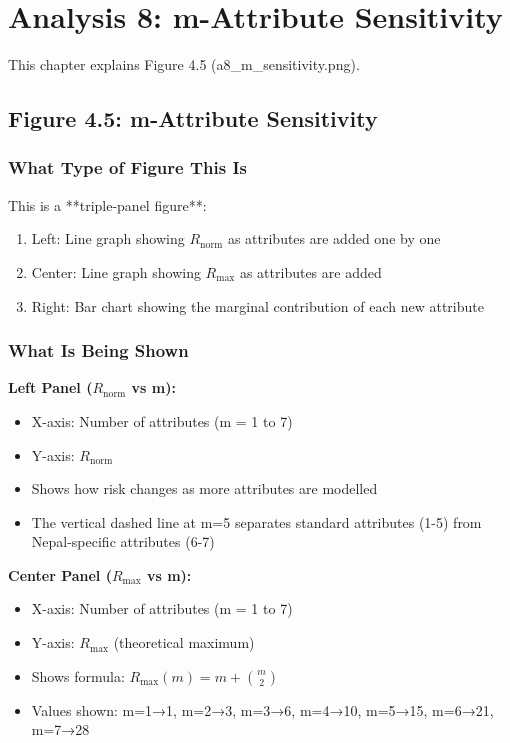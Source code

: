 \documentclass[12pt,a4paper,oneside,openany]{report}
\begin{document}
\chapter{Analysis 8: m-Attribute Sensitivity}
\label{chap:a8}

This chapter explains Figure 4.5 (a8\_m\_sensitivity.png).

\section{Figure 4.5: m-Attribute Sensitivity}
\label{sec:f4.5}

\subsection{What Type of Figure This Is}
This is a **triple-panel figure**:
\begin{enumerate}
    \item Left: Line graph showing $R_{\mathrm{norm}}$ as attributes are added one by one
    \item Center: Line graph showing $R_{\mathrm{max}}$ as attributes are added
    \item Right: Bar chart showing the marginal contribution of each new attribute
\end{enumerate}

\subsection{What Is Being Shown}

\textbf{Left Panel ($R_{\mathrm{norm}}$ vs m):}
\begin{itemize}
    \item X-axis: Number of attributes (m = 1 to 7)
    \item Y-axis: $R_{\mathrm{norm}}$
    \item Shows how risk changes as more attributes are modelled
    \item The vertical dashed line at m=5 separates standard attributes (1-5) from Nepal-specific attributes (6-7)
\end{itemize}

\textbf{Center Panel ($R_{\mathrm{max}}$ vs m):}
\begin{itemize}
    \item X-axis: Number of attributes (m = 1 to 7)
    \item Y-axis: $R_{\mathrm{max}}$ (theoretical maximum)
    \item Shows formula: $R_{\mathrm{max}}(m) = m + \binom{m}{2}$
    \item Values shown: m=1→1, m=2→3, m=3→6, m=4→10, m=5→15, m=6→21, m=7→28
\end{itemize}
\end{document}
